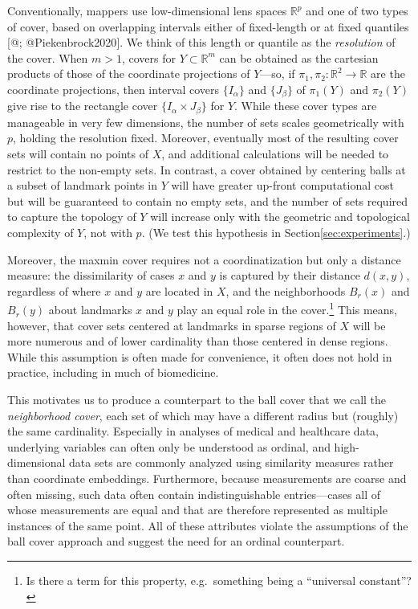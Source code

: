 \documentclass[
]{article}
\begin{document}
Conventionally, mappers use low-dimensional lens spaces \(\mathbb{R}^p\)
and one of two types of cover, based on overlapping intervals either of
fixed-length or at fixed quantiles {[}@; @Piekenbrock2020{]}. We think
of this length or quantile as the \emph{resolution} of the cover. When
\(m>1\), covers for \(Y\subset\mathbb{R}^m\) can be obtained as the
cartesian products of those of the coordinate projections of \(Y\)---so,
if \(\pi_1,\pi_2:\mathbb{R}^2\to\mathbb{R}\) are the coordinate
projections, then interval covers \(\{I_\alpha\}\) and \(\{J_\beta\}\)
of \(\pi_1(Y)\) and \(\pi_2(Y)\) give rise to the rectangle cover
\(\{I_\alpha \times J_\beta\}\) for \(Y\). While these cover types are
manageable in very few dimensions, the number of sets scales
geometrically with \(p\), holding the resolution fixed. Moreover,
eventually most of the resulting cover sets will contain no points of
\(X\), and additional calculations will be needed to restrict to the
non-empty sets. In contrast, a cover obtained by centering balls at a
subset of landmark points in \(Y\) will have greater up-front
computational cost but will be guaranteed to contain no empty sets, and
the number of sets required to capture the topology of \(Y\) will
increase only with the geometric and topological complexity of \(Y\),
not with \(p\). (We test this hypothesis in
Section\nbs\ref{sec:experiments}.)

Moreover, the maxmin cover requires not a coordinatization but only a
distance measure: the dissimilarity of cases \(x\) and \(y\) is captured
by their distance \(d(x,y)\), regardless of where \(x\) and \(y\) are
located in \(X\), and the neighborhoods \(B_r(x)\) and \(B_r(y)\) about
landmarks \(x\) and \(y\) play an equal role in the cover.\footnote{Is
  there a term for this property, e.g.~something being a ``universal
  constant''?} This means, however, that cover sets centered at
landmarks in sparse regions of \(X\) will be more numerous and of lower
cardinality than those centered in dense regions. While this assumption
is often made for convenience, it often does not hold in practice,
including in much of biomedicine.

This motivates us to produce a counterpart to the ball cover that we
call the \emph{neighborhood cover}, each set of which may have a
different radius but (roughly) the same cardinality. Especially in
analyses of medical and healthcare data, underlying variables can often
only be understood as ordinal, and high-dimensional data sets are
commonly analyzed using similarity measures rather than coordinate
embeddings. Furthermore, because measurements are coarse and often
missing, such data often contain indistinguishable entries---cases all
of whose measurements are equal and that are therefore represented as
multiple instances of the same point. All of these attributes violate
the assumptions of the ball cover approach and suggest the need for an
ordinal counterpart.
\end{document}

